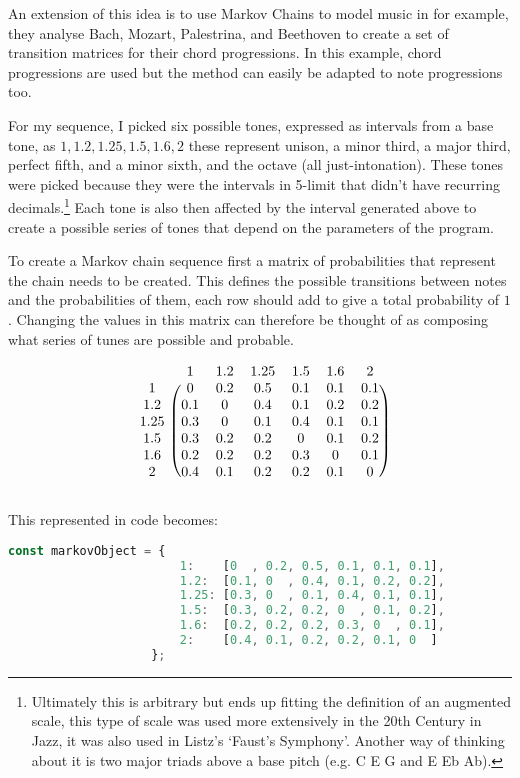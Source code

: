 An extension of this idea is to use Markov Chains to model music in
\citep{ballstate2016} for example, they analyse Bach, Mozart, Palestrina, and
Beethoven to create a set of transition matrices for their chord progressions.
In this example, chord progressions are used but the method can easily be adapted
to note progressions too. 

For my sequence, I picked six possible tones, expressed as intervals from a base
tone, as $1, 1.2, 1.25, 1.5, 1.6, 2$ these represent unison, a minor third, a
major third, perfect fifth, and a minor sixth, and the octave (all
just-intonation). These tones were picked because they were the intervals in
5-limit that didn't have recurring decimals.\footnote{Ultimately this is arbitrary but
ends up fitting the definition of an augmented scale, this type of scale was
used more extensively in the 20th Century in Jazz, it was also used in Listz's
`Faust's Symphony'. Another way of thinking about it is two major triads above a
base pitch (e.g. C E G and E Eb Ab).} Each tone is also then affected by the
interval generated above to create a possible series of tones that depend on the
parameters of the program.

To create a Markov chain sequence first a matrix of probabilities that represent
the chain needs to be created. This defines the possible transitions between
notes and the probabilities of them, each row should add to give a total
probability of $1$. Changing the values in this matrix can therefore be thought
of as composing what series of tunes are possible and probable.

\[
\begin{blockarray}{ccccccc}
    & 1 & 1.2 & 1.25 & 1.5 & 1.6 & 2\\
    \begin{block}{c (cccccc)}
        1    & 0  & 0.2& 0.5& 0.1& 0.1& 0.1\\
        1.2  & 0.1& 0  & 0.4& 0.1& 0.2& 0.2\\
        1.25 & 0.3& 0  & 0.1& 0.4& 0.1& 0.1\\
        1.5  & 0.3& 0.2& 0.2& 0  & 0.1& 0.2\\
        1.6  & 0.2& 0.2& 0.2& 0.3& 0  & 0.1\\
        2    & 0.4& 0.1& 0.2& 0.2& 0.1& 0  \\
    \end{block}
\end{blockarray}
\]

This represented in code becomes: 
\begin{lstlisting}[language=Javascript]
const markovObject = {
                        1:    [0  , 0.2, 0.5, 0.1, 0.1, 0.1],
                        1.2:  [0.1, 0  , 0.4, 0.1, 0.2, 0.2],
                        1.25: [0.3, 0  , 0.1, 0.4, 0.1, 0.1],
                        1.5:  [0.3, 0.2, 0.2, 0  , 0.1, 0.2],
                        1.6:  [0.2, 0.2, 0.2, 0.3, 0  , 0.1],
                        2:    [0.4, 0.1, 0.2, 0.2, 0.1, 0  ]
                    };
\end{lstlisting}

